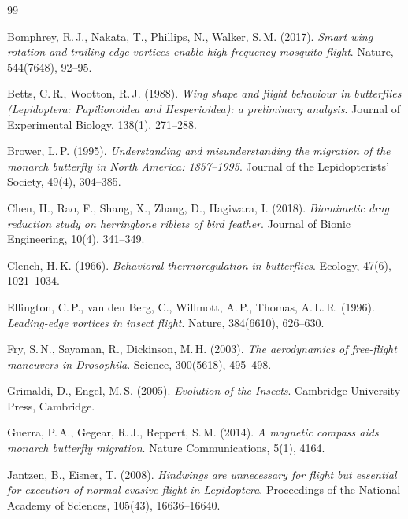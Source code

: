 ﻿\documentclass[a4paper,12pt]{article}
\theoremstyle{definition}
\begin{document}
	\begin{thebibliography}{99}
		
		Bomphrey, R.\,J., Nakata, T., Phillips, N., Walker, S.\,M. (2017).
		\textit{Smart wing rotation and trailing-edge vortices enable high frequency
			mosquito flight}.
		Nature, 544(7648), 92--95.
		
		Betts, C.\,R., Wootton, R.\,J. (1988).
		\textit{Wing shape and flight behaviour in butterflies (Lepidoptera:
			Papilionoidea and Hesperioidea): a preliminary analysis}.
		Journal of Experimental Biology, 138(1), 271--288.
		
		Brower, L.\,P. (1995).
		\textit{Understanding and misunderstanding the migration of the monarch butterfly
			in North America: 1857--1995}.
		Journal of the Lepidopterists' Society, 49(4), 304--385.
		
		Chen, H., Rao, F., Shang, X., Zhang, D., Hagiwara, I. (2018).
		\textit{Biomimetic drag reduction study on herringbone riblets of bird feather}.
		Journal of Bionic Engineering, 10(4), 341--349.
		
		Clench, H.\,K. (1966).
		\textit{Behavioral thermoregulation in butterflies}.
		Ecology, 47(6), 1021--1034.
		
		Ellington, C.\,P., van den Berg, C., Willmott, A.\,P., Thomas, A.\,L.\,R. (1996).
		\textit{Leading-edge vortices in insect flight}.
		Nature, 384(6610), 626--630.
		
		Fry, S.\,N., Sayaman, R., Dickinson, M.\,H. (2003).
		\textit{The aerodynamics of free-flight maneuvers in Drosophila}.
		Science, 300(5618), 495--498.
		
		Grimaldi, D., Engel, M.\,S. (2005).
		\textit{Evolution of the Insects}.
		Cambridge University Press, Cambridge.
		
		Guerra, P.\,A., Gegear, R.\,J., Reppert, S.\,M. (2014).
		\textit{A magnetic compass aids monarch butterfly migration}.
		Nature Communications, 5(1), 4164.
		
		Jantzen, B., Eisner, T. (2008).
		\textit{Hindwings are unnecessary for flight but essential for execution of
			normal evasive flight in Lepidoptera}.
		Proceedings of the National Academy of Sciences, 105(43), 16636--16640.
		

\end{thebibliography}
\end{document}
